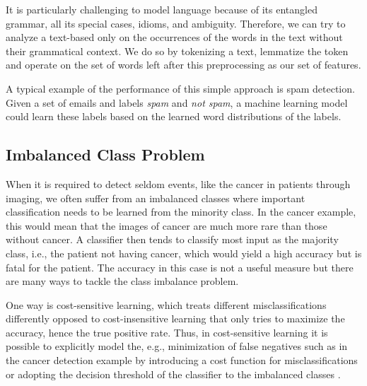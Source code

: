 It is particularly challenging to model language because of its entangled grammar, all its special cases, idioms, and ambiguity.
Therefore, we can try to analyze a text-based only on the occurrences of the words in the text without their grammatical context. We do so by tokenizing a text, lemmatize the token and operate on the set of words left after this preprocessing as our set of features.

A typical example of the performance of this simple approach is spam detection.
Given a set of emails and labels \emph{spam} and \emph{not spam}, a machine learning model could learn these labels based on the learned word distributions of the labels.

\subsection{Imbalanced Class Problem}
When it is required to detect seldom events, like the cancer in patients through imaging, we often suffer from an imbalanced classes where important classification needs to be learned from the minority class. In the cancer example, this would mean that the images of cancer are much more rare than those without cancer. A classifier then tends to classify most input as the majority class, i.e., the patient not having cancer, which would yield a high accuracy but is fatal for the patient. The accuracy in this case is not a useful measure but there are many ways to tackle the class imbalance problem.

One way is cost-sensitive learning, which treats different misclassifications differently opposed to cost-insensitive learning that only tries to maximize the accuracy, hence the true positive rate. Thus, in cost-sensitive learning it is possible to explicitly model the, e.g.,  minimization of false negatives such as in the cancer detection example by introducing a cost function for misclassifications or adopting the decision threshold of the classifier to the imbalanced classes \citep{Ling2008}.

